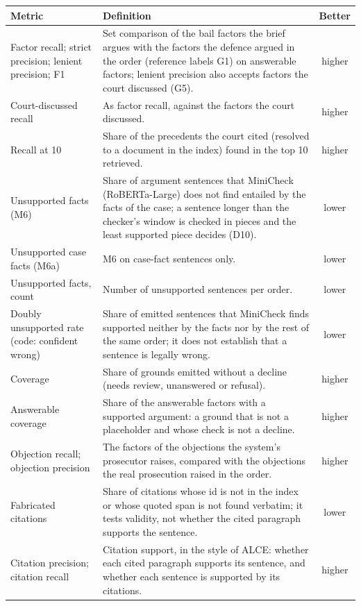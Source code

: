 \documentclass[11pt]{article}
\begin{document}
{\centering\footnotesize
\renewcommand{\arraystretch}{0.88}
\begin{longtable}{@{}L{4.2cm}L{9.9cm}c@{}}
\toprule
Metric & Definition & Better \\
\midrule
Factor recall; strict precision; lenient precision; F1 & Set comparison of the bail factors the brief argues with the factors the defence argued in the order (reference labels G1) on answerable factors; lenient precision also accepts factors the court discussed (G5). & higher \\
Court-discussed recall & As factor recall, against the factors the court discussed. & higher \\
Recall at 10 & Share of the precedents the court cited (resolved to a document in the index) found in the top 10 retrieved. & higher \\
Unsupported facts (M6) & Share of argument sentences that MiniCheck (RoBERTa-Large) does not find entailed by the facts of the case; a sentence longer than the checker's window is checked in pieces and the least supported piece decides (D10). & lower \\
Unsupported case facts (M6a) & M6 on case-fact sentences only. & lower \\
Unsupported facts, count & Number of unsupported sentences per order. & lower \\
Doubly unsupported rate (code: confident wrong) & Share of emitted sentences that MiniCheck finds supported neither by the facts nor by the rest of the same order; it does not establish that a sentence is legally wrong. & lower \\
Coverage & Share of grounds emitted without a decline (needs review, unanswered or refusal). & higher \\
Answerable coverage & Share of the answerable factors with a supported argument: a ground that is not a placeholder and whose check is not a decline. & higher \\
Objection recall; objection precision & The factors of the objections the system's prosecutor raises, compared with the objections the real prosecution raised in the order. & higher \\
Fabricated citations & Share of citations whose id is not in the index or whose quoted span is not found verbatim; it tests validity, not whether the cited paragraph supports the sentence. & lower \\
Citation precision; citation recall & Citation support, in the style of ALCE: whether each cited paragraph supports its sentence, and whether each sentence is supported by its citations. & higher \\

\end{longtable}}
\end{document}

